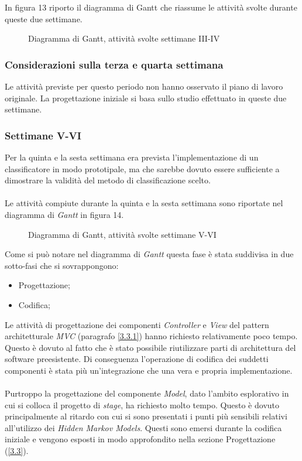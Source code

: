 In figura 13 riporto il diagramma di Gantt che riassume le attività svolte durante queste due settimane.
\begin{figure}[H]
\centering
\noindent{}
\caption{Diagramma di Gantt, attività svolte settimane III-IV}
\end{figure}
\subsubsection*{Considerazioni sulla terza e quarta settimana}
\label{3.1.2.1}
Le attività previste per questo periodo non hanno osservato il piano di lavoro originale. La progettazione iniziale si basa sullo studio effettuato in queste due settimane.

\subsubsection{Settimane V-VI}
\label{3.1.3}
Per la quinta e la sesta settimana era prevista l'implementazione di un classificatore in modo prototipale, ma che sarebbe dovuto essere sufficiente a dimostrare la validità del metodo di classificazione scelto.\\\\
Le attività compiute durante la quinta e la sesta settimana sono riportate nel diagramma di \emph{Gantt} in figura 14.
\begin{figure}[H]
\centering
\noindent{}
\caption{Diagramma di Gantt, attività svolte settimane V-VI}
\end{figure}

Come si può notare nel diagramma di \emph{Gantt} questa fase è stata suddivisa in due sotto-fasi che si sovrappongono:
\begin{itemize}
\item Progettazione;
\item Codifica;
\end{itemize}
Le attività di progettazione dei componenti \emph{Controller} e \emph{View} del pattern architetturale \emph{MVC} (paragrafo \ref{3.3.1}) hanno richiesto relativamente poco tempo. Questo è dovuto al fatto che è stato possibile riutilizzare parti di architettura del software preesistente. Di conseguenza l'operazione di codifica dei suddetti componenti è stata più un'integrazione che una vera e propria implementazione.\\\\
Purtroppo la progettazione del componente \emph{Model}, dato l'ambito esplorativo in cui si colloca il progetto di \emph{stage}, ha richiesto molto tempo. Questo è dovuto principalmente al ritardo con cui si sono presentati i punti più sensibili relativi all'utilizzo dei \emph{Hidden Markov Models}. Questi sono emersi durante la codifica iniziale e vengono esposti in modo approfondito nella sezione Progettazione (\ref{3.3}).


